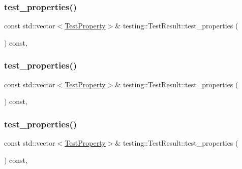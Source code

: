 \mbox{\label{classtesting_1_1_test_result_a8c94e8e89c616abe5d33024a6b54f218}} 
\subsubsection{\texorpdfstring{test\_properties()}{test\_properties()}\hspace{0.1cm}{\footnotesize\ttfamily [1/3]}}
{\footnotesize\ttfamily const std\+::vector$<$\mbox{\hyperlink{classtesting_1_1_test_property}{Test\+Property}}$>$\& testing\+::\+Test\+Result\+::test\+\_\+properties (\begin{DoxyParamCaption}{ }\end{DoxyParamCaption}) const\hspace{0.3cm}{\ttfamily [inline]}, {\ttfamily [private]}}

\mbox{\label{classtesting_1_1_test_result_a8c94e8e89c616abe5d33024a6b54f218}} 
\subsubsection{\texorpdfstring{test\_properties()}{test\_properties()}\hspace{0.1cm}{\footnotesize\ttfamily [2/3]}}
{\footnotesize\ttfamily const std\+::vector$<$\mbox{\hyperlink{classtesting_1_1_test_property}{Test\+Property}}$>$\& testing\+::\+Test\+Result\+::test\+\_\+properties (\begin{DoxyParamCaption}{ }\end{DoxyParamCaption}) const\hspace{0.3cm}{\ttfamily [inline]}, {\ttfamily [private]}}

\mbox{\label{classtesting_1_1_test_result_a8c94e8e89c616abe5d33024a6b54f218}} 
\subsubsection{\texorpdfstring{test\_properties()}{test\_properties()}\hspace{0.1cm}{\footnotesize\ttfamily [3/3]}}
{\footnotesize\ttfamily const std\+::vector$<$\mbox{\hyperlink{classtesting_1_1_test_property}{Test\+Property}}$>$\& testing\+::\+Test\+Result\+::test\+\_\+properties (\begin{DoxyParamCaption}{ }\end{DoxyParamCaption}) const\hspace{0.3cm}{\ttfamily [inline]}, {\ttfamily [private]}}

